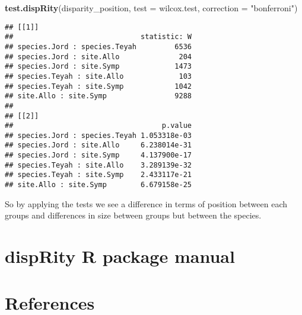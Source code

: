 \documentclass[
]{book}
\newenvironment{Shaded}{\begin{snugshade}}{\end{snugshade}}
\newcommand{\DataTypeTok}[1]{\textcolor[rgb]{0.13,0.29,0.53}{#1}}
\newcommand{\KeywordTok}[1]{\textcolor[rgb]{0.13,0.29,0.53}{\textbf{#1}}}
\newcommand{\NormalTok}[1]{#1}
\newcommand{\StringTok}[1]{\textcolor[rgb]{0.31,0.60,0.02}{#1}}
\begin{document}
\begin{Shaded}
\begin{Highlighting}[]
\KeywordTok{test.dispRity}\NormalTok{(disparity\_position, }\DataTypeTok{test =}\NormalTok{ wilcox.test, }\DataTypeTok{correction =} \StringTok{"bonferroni"}\NormalTok{)}
\end{Highlighting}
\end{Shaded}

\begin{verbatim}
## [[1]]
##                              statistic: W
## species.Jord : species.Teyah         6536
## species.Jord : site.Allo              204
## species.Jord : site.Symp             1473
## species.Teyah : site.Allo             103
## species.Teyah : site.Symp            1042
## site.Allo : site.Symp                9288
## 
## [[2]]
##                                   p.value
## species.Jord : species.Teyah 1.053318e-03
## species.Jord : site.Allo     6.238014e-31
## species.Jord : site.Symp     4.137900e-17
## species.Teyah : site.Allo    3.289139e-32
## species.Teyah : site.Symp    2.433117e-21
## site.Allo : site.Symp        6.679158e-25
\end{verbatim}

So by applying the tests we see a difference in terms of position between each groups and differences in size between groups but between the species.

\hypertarget{disprity-r-package-manual}{%
\chapter{dispRity R package manual}\label{disprity-r-package-manual}}

\hypertarget{references}{%
\chapter{References}\label{references}}

  
\end{document}
